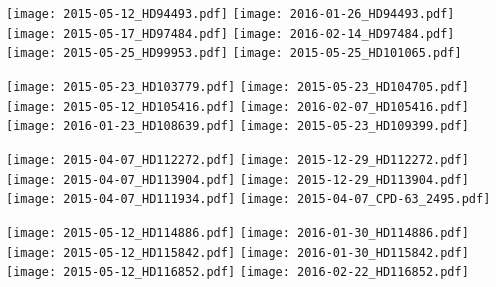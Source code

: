 \documentclass[a4paper]{aa}
\begin{document}
\noindent
  \texttt{[image: 2015-05-12\_HD94493.pdf]}
  \texttt{[image: 2016-01-26\_HD94493.pdf]}\\
  \texttt{[image: 2015-05-17\_HD97484.pdf]}
  \texttt{[image: 2016-02-14\_HD97484.pdf]}\\
  \texttt{[image: 2015-05-25\_HD99953.pdf]}
  \texttt{[image: 2015-05-25\_HD101065.pdf]}
\newpage

\noindent
  \texttt{[image: 2015-05-23\_HD103779.pdf]}
  \texttt{[image: 2015-05-23\_HD104705.pdf]}\\
  \texttt{[image: 2015-05-12\_HD105416.pdf]}
  \texttt{[image: 2016-02-07\_HD105416.pdf]}\\
  \texttt{[image: 2016-01-23\_HD108639.pdf]}
  \texttt{[image: 2015-05-23\_HD109399.pdf]}
\newpage

\noindent
  \texttt{[image: 2015-04-07\_HD112272.pdf]}
  \texttt{[image: 2015-12-29\_HD112272.pdf]}\\
  \texttt{[image: 2015-04-07\_HD113904.pdf]}
  \texttt{[image: 2015-12-29\_HD113904.pdf]}\\
  \texttt{[image: 2015-04-07\_HD111934.pdf]}
  \texttt{[image: 2015-04-07\_CPD-63\_2495.pdf]}

\newpage
\noindent
  \texttt{[image: 2015-05-12\_HD114886.pdf]}
  \texttt{[image: 2016-01-30\_HD114886.pdf]}\\
  \texttt{[image: 2015-05-12\_HD115842.pdf]}
  \texttt{[image: 2016-01-30\_HD115842.pdf]}\\
  \texttt{[image: 2015-05-12\_HD116852.pdf]}
  \texttt{[image: 2016-02-22\_HD116852.pdf]}
\newpage
\end{document}
